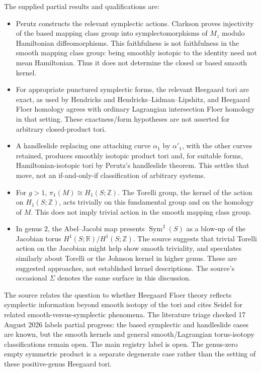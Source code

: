 \documentclass[11pt]{article}
\newcommand{\Z}{\mathbb{Z}}
\newcommand{\R}{\mathbb{R}}
\begin{document}
The supplied partial results and qualifications are:
\begin{itemize}
\item Perutz constructs the relevant symplectic actions. Clarkson proves injectivity of the based mapping class group into symplectomorphisms of $M_z$ modulo Hamiltonian diffeomorphisms. This faithfulness is not faithfulness in the smooth mapping class group: being smoothly isotopic to the identity need not mean Hamiltonian. Thus it does not determine the closed or based smooth kernel.
\item For appropriate punctured symplectic forms, the relevant Heegaard tori are exact, as used by Hendricks and Hendricks--Lidman--Lipshitz, and Heegaard Floer homology agrees with ordinary Lagrangian intersection Floer homology in that setting. These exactness/form hypotheses are not asserted for arbitrary closed-product tori.
\item A handleslide replacing one attaching curve $\alpha_1$ by $\alpha'_1$, with the other curves retained, produces smoothly isotopic product tori and, for suitable forms, Hamiltonian-isotopic tori by Perutz's handleslide theorem. This settles that move, not an if-and-only-if classification of arbitrary systems.
\item For $g>1$, $\pi_1(M)\cong H_1(S;\Z)$. The Torelli group, the kernel of the action on $H_1(S;\Z)$, acts trivially on this fundamental group and on the homology of $M$. This does not imply trivial action in the smooth mapping class group.
\item In genus $2$, the Abel--Jacobi map presents $\operatorname{Sym}^2(S)$ as a blow-up of the Jacobian torus $H^1(S;\R)/H^1(S;\Z)$. The source suggests that trivial Torelli action on the Jacobian might help show smooth triviality, and speculates similarly about Torelli or the Johnson kernel in higher genus. These are suggested approaches, not established kernel descriptions. The source's occasional $\Sigma$ denotes the same surface in this discussion.
\end{itemize}
The source relates the question to whether Heegaard Floer theory reflects symplectic information beyond smooth isotopy of the tori and cites Seidel for related smooth-versus-symplectic phenomena. The literature triage checked 17 August 2026 labels partial progress: the based symplectic and handleslide cases are known, but the smooth kernels and general smooth/Lagrangian torus-isotopy classifications remain open. The main registry label is open. The genus-zero empty symmetric product is a separate degenerate case rather than the setting of these positive-genus Heegaard tori.
\end{document}
